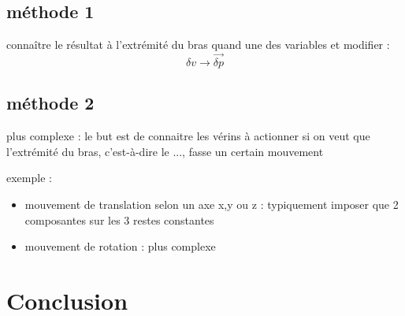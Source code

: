 \documentclass[12pt,a4paper]{article}
\begin{document}
\subsection{méthode 1}
connaître le résultat à l'extrémité du bras quand une des variables et modifier : 
\begin{equation}
\delta v \rightarrow \vec{\delta p}
\end{equation}

\subsection{méthode 2}
plus complexe : 
le but est de connaitre les vérins à actionner si on veut que l'extrémité du bras, c'est-à-dire le ..., fasse un certain mouvement

exemple : 
\begin{itemize}
	\item mouvement de translation selon un axe x,y ou z : typiquement imposer que 2 composantes sur les 3 restes constantes
	\item mouvement de rotation : plus complexe
\end{itemize}



\newpage

\section{Conclusion}
\end{document}
